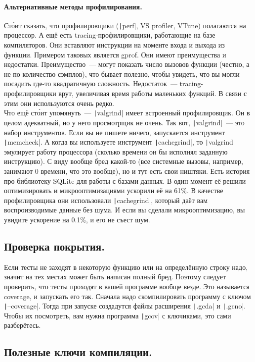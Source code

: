 \documentclass{article}
\begin{document}
    \paragraph{Альтернативные методы профилирования.}
    Ст\'{о}ит сказать, что профилировщики (\texttt|perf|, VS profiler, VTune) полагаются на процессор. А ещё есть tracing-профилировщики, работающие на базе компиляторов. Они вставляют инструкции на моменте входа и выхода из функции. Примером таковых является gprof. Они имеют преимущества и недостатки. Преимущество~--- могут показать число вызовов функции (честно, а не по количество сэмплов), что бывает полезно, чтобы увидеть, что вы могли посадить где-то квадратичную сложность. Недостаток~--- tracing-профилировщики врут, увеличивая время работы маленьких функций. В связи с этим они используются очень редко.\\
    Что ещё ст\'{о}ит упомянуть~--- \texttt|valgrind| имеет встроенный профилировщик. Он в целом адекватный, но у него просмотрщик не очень. Так вот, \texttt|valgrind|~--- это набор инструментов. Если вы не пишете ничего, запускается инструмент \texttt|memcheck|. А когда вы используете инструмент \texttt|cachegrind|, то \texttt|valgrind| эмулирует работу процессора (сколько времени он бы исполнял заданную инструкцию). С виду вообще бред какой-то (все системные вызовы, например, занимают 0 времени, что это вообще), но и тут есть свои ништяки. Есть история про библиотеку SQLite для работы с базами данных. В один момент её решили оптимизировать и микрооптимизациями ускорили её на 61\%. В качестве профилировщика они использовали \texttt|cachegrind|, который даёт вам воспроизводимые данные без шума. И если вы сделали микрооптимизацию, вы увидите ускорение на 0.1\%, и его не съест шум.
    \subsection{Проверка покрытия.}
    Если тесты не заходят в некоторую функцию или на определённую строку надо, значит на тех местах может быть написан полный бред. Поэтому следует проверить, что тесты проходят в вашей программе вообще везде. Это называется coverage, и запускать его так. Сначала надо скомпилировать программу с ключом \texttt|--coverage|. Тогда при запуске создадутся файлы расширения \texttt|.gcda| и \texttt|.gcno|. Чтобы их посмотреть, вам нужна программа \texttt|gcov| с ключиками, это сами разберётесь.
    \subsection{Полезные ключи компиляции.}
\end{document}
